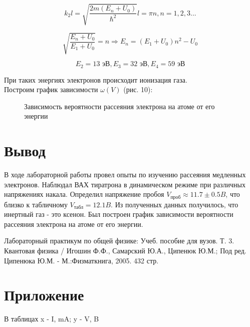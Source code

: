 \documentclass[14pt,a4paper]{scrartcl}
\begin{document}
$$k_2l = \sqrt{\frac{2m(E_n+U_0)}{\hbar^2}}l = \pi n, n = 1, 2, 3...$$ 

$$\sqrt{\frac{E_n + U_0}{E_1 + U_0}} = n \Rightarrow E_n = (E_1 + U_0) n^2 - U_0$$

$$E_2 = 13 \text{ эВ}, E_3 = 32 \text{ эВ}, E_4= 59 \text{ эВ}$$ 

При таких энергиях электронов происходит ионизация газа.\\

Построим график зависимости $\omega(V)$ (рис. 10):

\begin{figure}[ht!]\label{omega} 
\caption{Зависимость вероятности рассеяния электрона на атоме от его энергии}
\end{figure}
 

\newpage

\section{Вывод}


В ходе лабораторной работы провел опыты по изучению рассеяния медленных электронов. Наблюдал ВАХ тиратрона в динамическом режиме при различных напряжениях накала. Определил напряжение пробоя $V_{\text{проб}} \approx 11.7 \pm 0.5 B$, что близко к табличному $V_{\text{табл}} = 12.1 B$. Из полученных данных получилось, что инертный газ - это ксенон. Был построен график зависимости вероятности рассеяния электрона на атоме от его энергии.





\begin{thebibliography}{}

Лабораторный практикум по общей физике: Учеб. пособие для вузов. Т. 3. Квантовая физика / Игошин Ф.Ф., Самарский Ю.А., Ципенюк Ю.М.; Под ред. Ципенюка Ю.М. - М.:Физматкнига, 2005. 432 стр.


\newpage

\section{Приложение}
В таблицах x - I, mA; y - V, B
	
\end{thebibliography}
\end{document}
